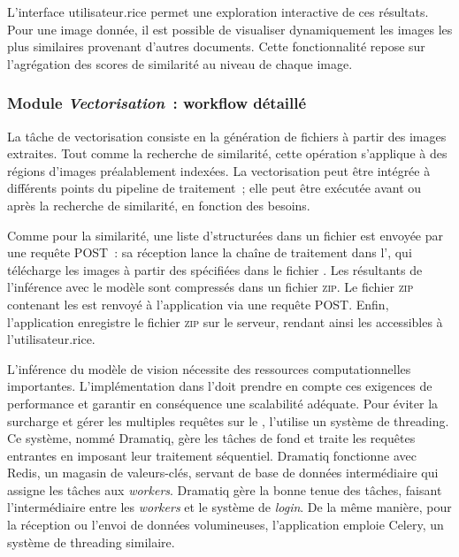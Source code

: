 L'interface utilisateur.rice permet une exploration interactive de ces
résultats. Pour une image donnée, il est possible de visualiser
dynamiquement les images les plus similaires provenant d'autres
documents. Cette fonctionnalité repose sur l'agrégation des scores de
similarité au niveau de chaque image.

\hypertarget{module-vectorisation-workflow-detaille}{%
\subsubsection{\texorpdfstring{Module \emph{Vectorisation}~: workflow
détaillé}{Module Vectorisation~: workflow détaillé}}\label{module-vectorisation-workflow-detaille}}

La tâche de vectorisation consiste en la génération de fichiers \svgs à
partir des images extraites. Tout comme la recherche de similarité,
cette opération s'applique à des régions d'images préalablement
indexées. La vectorisation peut être intégrée à différents points du
pipeline de traitement~; elle peut être exécutée avant ou après la
recherche de similarité, en fonction des besoins.

Comme pour la similarité, une liste d'\URL structurées dans un fichier
\json est envoyée par une requête \http POST~: sa réception lance la
chaîne de traitement dans l'\api, qui télécharge les images à partir
des \URLs spécifiées dans le fichier \json. Les \svgs résultants de
l'inférence avec le modèle sont compressés dans un fichier \textsc{zip}. Le
fichier \textsc{zip} contenant les \svgs est renvoyé à l'application via une
requête \http POST. Enfin, l'application enregistre le fichier \textsc{zip} sur le
serveur, rendant ainsi les \svg accessibles à l'utilisateur.rice.

L'inférence du modèle de vision nécessite des ressources
computationnelles importantes. L'implémentation dans l'\api doit prendre
en compte ces exigences de performance et garantir en conséquence une
scalabilité adéquate. Pour éviter la surcharge et gérer les multiples
requêtes sur le \gpu, l'\api utilise un système de threading. Ce système,
nommé Dramatiq, gère les tâches de fond et traite les requêtes entrantes
en imposant leur traitement séquentiel. Dramatiq fonctionne avec Redis,
un magasin de valeurs-clés, servant de base de données intermédiaire qui
assigne les tâches aux \emph{workers}. Dramatiq gère la bonne tenue des
tâches, faisant l'intermédiaire entre les \textit{workers} et le système de
\textit{login}. De la même manière, pour la réception ou l'envoi de données
volumineuses, l'application emploie Celery, un système de threading
similaire.

